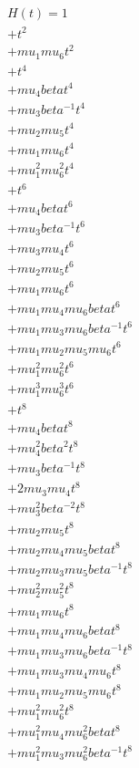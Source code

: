 \begin{align*}
H(t) = {}1 \\
  + t^{2} \\
  + mu_1 mu_6 t^{2} \\
  + t^{4} \\
  + mu_4 beta t^{4} \\
  + mu_3 beta^{-1} t^{4} \\
  + mu_2 mu_5 t^{4} \\
  + mu_1 mu_6 t^{4} \\
  + mu_1^{2} mu_6^{2} t^{4} \\
  + t^{6} \\
  + mu_4 beta t^{6} \\
  + mu_3 beta^{-1} t^{6} \\
  + mu_3 mu_4 t^{6} \\
  + mu_2 mu_5 t^{6} \\
  + mu_1 mu_6 t^{6} \\
  + mu_1 mu_4 mu_6 beta t^{6} \\
  + mu_1 mu_3 mu_6 beta^{-1} t^{6} \\
  + mu_1 mu_2 mu_5 mu_6 t^{6} \\
  + mu_1^{2} mu_6^{2} t^{6} \\
  + mu_1^{3} mu_6^{3} t^{6} \\
  + t^{8} \\
  + mu_4 beta t^{8} \\
  + mu_4^{2} beta^{2} t^{8} \\
  + mu_3 beta^{-1} t^{8} \\
  + 2 mu_3 mu_4 t^{8} \\
  + mu_3^{2} beta^{-2} t^{8} \\
  + mu_2 mu_5 t^{8} \\
  + mu_2 mu_4 mu_5 beta t^{8} \\
  + mu_2 mu_3 mu_5 beta^{-1} t^{8} \\
  + mu_2^{2} mu_5^{2} t^{8} \\
  + mu_1 mu_6 t^{8} \\
  + mu_1 mu_4 mu_6 beta t^{8} \\
  + mu_1 mu_3 mu_6 beta^{-1} t^{8} \\
  + mu_1 mu_3 mu_4 mu_6 t^{8} \\
  + mu_1 mu_2 mu_5 mu_6 t^{8} \\
  + mu_1^{2} mu_6^{2} t^{8} \\
  + mu_1^{2} mu_4 mu_6^{2} beta t^{8} \\
  + mu_1^{2} mu_3 mu_6^{2} beta^{-1} t^{8} \\

\end{align*}
